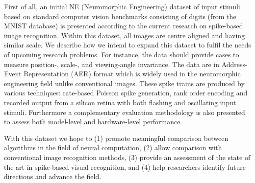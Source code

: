 \documentclass[journal]{journal}
\begin{document}
	First of all, an initial NE (Neuromorphic Engineering) dataset of input stimuli based on standard computer vision benchmarks consisting of %
	digits (from the MNIST database) is presented according to the current research on spike-based image recognition.
	Within this dataset, all images are centre aligned and having similar scale.
	We describe how we intend to expand this dataset to fulfil the needs of upcoming research problems.
	For instance, the data should provide cases to measure position-, scale-, and viewing-angle invariance.
	The data are in Address-Event Representation (AER) format which is widely used in the neuromorphic engineering field unlike conventional images.
	These spike trains are produced by various techniques: rate-based Poisson spike generation, rank order encoding and recorded output from a silicon retina with both flashing and oscillating input stimuli.
	Furthermore a complementary evaluation methodology is also presented to assess both model-level and hardware-level performance.
	
	With this dataset we hope to (1) promote meaningful comparison between algorithms in the field of neural computation, (2) allow comparison with conventional image recognition methods, (3) provide an assessment of the state of the art in spike-based visual recognition, and (4) help researchers identify future directions and advance the field.
	
\end{document}
